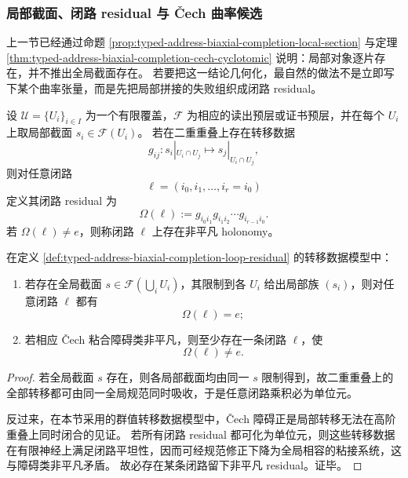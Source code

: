\subsubsection{局部截面、闭路 residual 与 Čech 曲率候选}\label{subsubsec:typed-address-biaxial-completion-local-sections-residual-curvature}
上一节已经通过命题 \ref{prop:typed-address-biaxial-completion-local-section} 与定理 \ref{thm:typed-address-biaxial-completion-cech-cyclotomic} 说明：局部对象逐片存在，并不推出全局截面存在。
若要把这一结论几何化，最自然的做法不是立即写下某个曲率张量，而是先把局部拼接的失败组织成闭路 residual。

\begin{definition}[闭路 residual]\label{def:typed-address-biaxial-completion-loop-residual}
设 \(\mathcal U=\{U_i\}_{i\in I}\) 为一个有限覆盖，\(\mathscr F\) 为相应的读出预层或证书预层，并在每个 \(U_i\) 上取局部截面 \(s_i\in \mathscr F(U_i)\)。
若在二重重叠上存在转移数据
\[
g_{ij}:s_i|_{U_i\cap U_j}\longmapsto s_j|_{U_i\cap U_j},
\]
则对任意闭路
\[
\ell=(i_0,i_1,\dots,i_r=i_0)
\]
定义其闭路 residual 为
\[
\Omega(\ell):=
g_{i_0i_1}g_{i_1i_2}\cdots g_{i_{r-1}i_0}.
\]
若 \(\Omega(\ell)\neq e\)，则称闭路 \(\ell\) 上存在非平凡 holonomy。
\end{definition}

\begin{proposition}[全局化与闭路平坦]\label{prop:typed-address-biaxial-completion-globalization-flatness}
在定义 \ref{def:typed-address-biaxial-completion-loop-residual} 的转移数据模型中：
\begin{enumerate}
  \item 若存在全局截面 \(s\in \mathscr F(\bigcup_i U_i)\)，其限制到各 \(U_i\) 给出局部族 \((s_i)\)，则对任意闭路 \(\ell\) 都有
  \[
  \Omega(\ell)=e;
  \]
  \item 若相应 Čech 粘合障碍类非平凡，则至少存在一条闭路 \(\ell\)，使
  \[
  \Omega(\ell)\neq e.
  \]
\end{enumerate}
\end{proposition}

\begin{proof}
若全局截面 \(s\) 存在，则各局部截面均由同一 \(s\) 限制得到，故二重重叠上的全部转移都可由同一全局规范同时吸收，于是任意闭路乘积必为单位元。

反过来，在本节采用的群值转移数据模型中，Čech 障碍正是局部转移无法在高阶重叠上同时闭合的见证。
若所有闭路 residual 都可化为单位元，则这些转移数据在有限神经上满足闭路平坦性，因而可经规范修正下降为全局相容的粘接系统，这与障碍类非平凡矛盾。
故必存在某条闭路留下非平凡 residual。证毕。
\end{proof}

